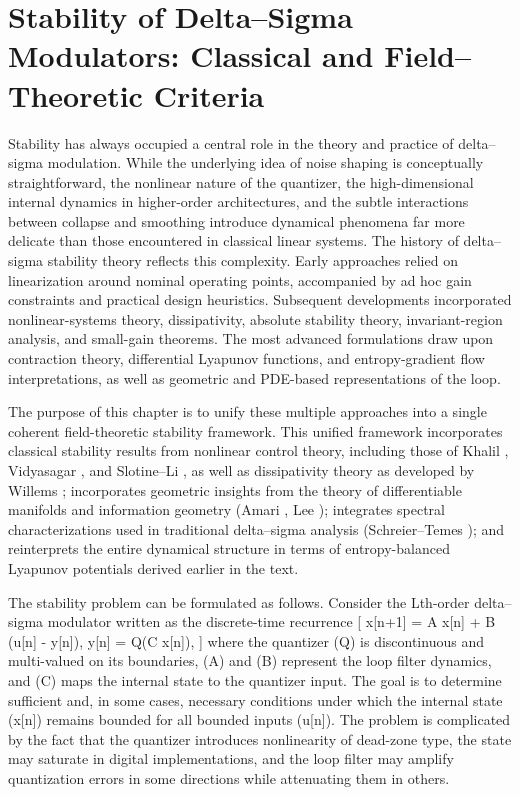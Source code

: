 \chapter{Stability of Delta–Sigma Modulators: Classical and Field–Theoretic Criteria}

Stability has always occupied a central role in the theory and practice of delta–sigma modulation. While the underlying idea of noise shaping is conceptually straightforward, the nonlinear nature of the quantizer, the high-dimensional internal dynamics in higher-order architectures, and the subtle interactions between collapse and smoothing introduce dynamical phenomena far more delicate than those encountered in classical linear systems. The history of delta–sigma stability theory reflects this complexity. Early approaches relied on linearization around nominal operating points, accompanied by ad hoc gain constraints and practical design heuristics. Subsequent developments incorporated nonlinear-systems theory, dissipativity, absolute stability theory, invariant-region analysis, and small-gain theorems. The most advanced formulations draw upon contraction theory, differential Lyapunov functions, and entropy-gradient flow interpretations, as well as geometric and PDE-based representations of the loop.

The purpose of this chapter is to unify these multiple approaches into a single coherent field-theoretic stability framework. This unified framework incorporates classical stability results from nonlinear control theory, including those of Khalil \cite{khalil2002nonlinear}, Vidyasagar \cite{vidyasagar1993nonlinear}, and Slotine–Li \cite{slotineli1991nonlinearcontrol}, as well as dissipativity theory as developed by Willems \cite{willems1972dissipative}; incorporates geometric insights from the theory of differentiable manifolds and information geometry (Amari \cite{amari2016informationgeometry}, Lee \cite{lee2013smoothmanifolds}); integrates spectral characterizations used in traditional delta–sigma analysis (Schreier–Temes \cite{schreiertemes2005deltasigma}); and reinterprets the entire dynamical structure in terms of entropy-balanced Lyapunov potentials derived earlier in the text.

The stability problem can be formulated as follows. Consider the Lth-order delta–sigma modulator written as the discrete-time recurrence
[
x[n+1] = A x[n] + B (u[n] - y[n]),
\qquad y[n] = Q(C x[n]),
]
where the quantizer (Q) is discontinuous and multi-valued on its boundaries, (A) and (B) represent the loop filter dynamics, and (C) maps the internal state to the quantizer input. The goal is to determine sufficient and, in some cases, necessary conditions under which the internal state (x[n]) remains bounded for all bounded inputs (u[n]). The problem is complicated by the fact that the quantizer introduces nonlinearity of dead-zone type, the state may saturate in digital implementations, and the loop filter may amplify quantization errors in some directions while attenuating them in others.


